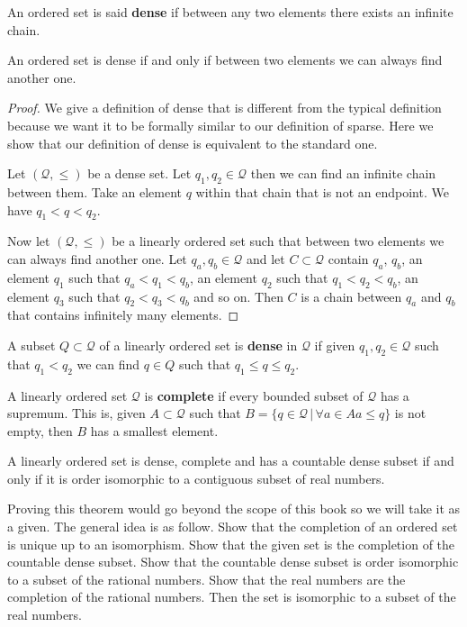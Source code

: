 \documentclass[11pt,letterpaper,fleqn]{memoir} %
\begin{document}
\begin{mathSection}
\begin{defn}
	An ordered set is said \textbf{dense} if between any two elements there exists an infinite chain.
\end{defn}
\begin{coro}
	An ordered set is dense if and only if between two elements we can always find another one.
\end{coro}
\begin{proof}
	We give a definition of dense that is different from the typical definition because we want it to be formally similar to our definition of sparse. Here we show that our definition of dense is equivalent to the standard one.
	
	Let $(\mathcal{Q}, \leq)$ be a dense set. Let $q_1, q_2 \in \mathcal{Q}$ then we can find an infinite chain between them. Take an element $q$ within that chain that is not an endpoint. We have $q_1 < q < q_2$.
	
	Now let $(\mathcal{Q}, \leq)$ be a linearly ordered set such that between two elements we can always find another one.  Let $q_a, q_b \in \mathcal{Q}$ and let $C \subset \mathcal{Q}$ contain $q_a$, $q_b$, an element $q_1$ such that $q_a < q_1 < q_b$, an element $q_2$ such that $q_1 < q_2 < q_b$, an element $q_3$ such that $q_2 < q_3 < q_b$ and so on. Then $C$ is a chain between $q_a$ and $q_b$ that contains infinitely many elements.
\end{proof}
\begin{defn}
	A subset $Q \subset \mathcal{Q}$ of a linearly ordered set is \textbf{dense} in $\mathcal{Q}$ if given $q_1, q_2 \in \mathcal{Q}$ such that $q_1 < q_2$ we can find $q \in Q$ such that $q_1 \leq q \leq q_2$.
\end{defn}
\begin{defn}
	A linearly ordered set $\mathcal{Q}$ is \textbf{complete} if every bounded subset of $\mathcal{Q}$ has a supremum. This is, given $A \subset \mathcal{Q}$ such that $B = \{ q \in \mathcal{Q} \, | \, \forall a \in A a \leq q \}$ is not empty, then $B$ has a smallest element.
\end{defn}
\begin{thrm}
	A linearly ordered set is dense, complete and has a countable dense subset if and only if it is order isomorphic to a contiguous subset of real numbers.
\end{thrm}
\begin{remark}
	Proving this theorem would go beyond the scope of this book so we will take it as a given. The general idea is as follow. Show that the completion of an ordered set is unique up to an isomorphism. Show that the given set is the completion of the countable dense subset. Show that the countable dense subset is order isomorphic to a subset of the rational numbers. Show that the real numbers are the completion of the rational numbers. Then the set is isomorphic to a subset of the real numbers.
\end{remark}
\end{mathSection}
\end{document}
